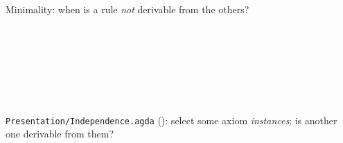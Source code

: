 \begin{frame}{Minimality: when is a rule \emph{not} derivable from the others? \New}
\begin{code}[hide]%
\>[0]\AgdaSpace{}%
\AgdaSpace{}%
\<%
\\
\>[0][@{}l@{\AgdaIndent{0}}]%
\>[2]\AgdaSpace{}%
\AgdaSpace{}%
\<%
\\
%
\>[2]\<%
\\
\>[2][@{}l@{\AgdaIndent{0}}]%
\>[4]\AgdaSpace{}%
\AgdaSymbol{:}\AgdaSpace{}%
\AgdaSpace{}%
\AgdaSymbol{\{}\AgdaSpace{}%
\AgdaSymbol{:}\AgdaSpace{}%
\AgdaSpace{}%
\AgdaSymbol{\}}\AgdaSpace{}%
\AgdaSymbol{\{}\AgdaSpace{}%
\AgdaSymbol{:}\AgdaSpace{}%
\AgdaSymbol{\}}\AgdaSpace{}%
\AgdaSpace{}%
\<%
\\
%
\>[4]\AgdaSpace{}%
\AgdaSymbol{:}\AgdaSpace{}%
\AgdaSpace{}%
\AgdaSpace{}%
\AgdaSpace{}%
\<%
\\
%
\>[4]\AgdaSpace{}%
\AgdaSymbol{:}\AgdaSpace{}%
\AgdaSpace{}%
\AgdaSpace{}%
\AgdaSpace{}%
\AgdaSpace{}%
\<%
\end{code}
\begin{columns}[c]
\begin{column}{0.56\textwidth}
\small \texttt{Presentation/Independence.agda} (): select some
axiom \emph{instances}; is another one derivable from them?
\begin{code}%
%
\>[2]\AgdaSpace{}%
\AgdaSymbol{:}\AgdaSpace{}%
\AgdaSpace{}%
\AgdaSpace{}%
\AgdaSpace{}%
\<%
\\
%
\>[2]\AgdaSpace{}%
\AgdaSpace{}%
\AgdaSymbol{=}\AgdaSpace{}%
\AgdaSpace{}%
\AgdaSymbol{\{}\AgdaSpace{}%
\AgdaSymbol{\}}\AgdaSpace{}%
\AgdaSpace{}%
\AgdaSpace{}%
\AgdaSpace{}%
\AgdaSpace{}%
\AgdaSpace{}%
\<%
\\

\end{code}
\end{column}
\end{columns}
\end{frame}
